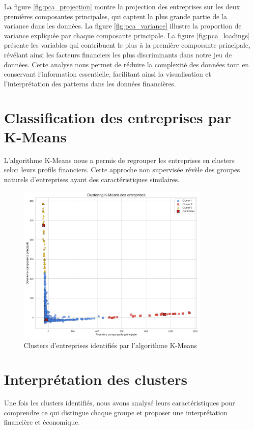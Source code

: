 \documentclass[11pt]{report}
\begin{document}
La figure \ref{fig:pca_projection} montre la projection des entreprises sur les deux premières composantes principales, qui captent la plus grande partie de la variance dans les données. La figure \ref{fig:pca_variance} illustre la proportion de variance expliquée par chaque composante principale. La figure \ref{fig:pca_loadings} présente les variables qui contribuent le plus à la première composante principale, révélant ainsi les facteurs financiers les plus discriminants dans notre jeu de données. Cette analyse nous permet de réduire la complexité des données tout en conservant l'information essentielle, facilitant ainsi la visualisation et l'interprétation des patterns dans les données financières.

\section{Classification des entreprises par K-Means}
L'algorithme K-Means nous a permis de regrouper les entreprises en clusters selon leurs profils financiers. Cette approche non supervisée révèle des groupes naturels d'entreprises ayant des caractéristiques similaires.

\begin{figure}[H]
    \centering
    \includegraphics[width=0.85\textwidth]{figures/kmeans_clusters.png}
    \caption{Clusters d'entreprises identifiés par l'algorithme K-Means}
    \label{fig:kmeans_clusters}
\end{figure}

\section{Interprétation des clusters}
Une fois les clusters identifiés, nous avons analysé leurs caractéristiques pour comprendre ce qui distingue chaque groupe et proposer une interprétation financière et économique.
\end{document}
